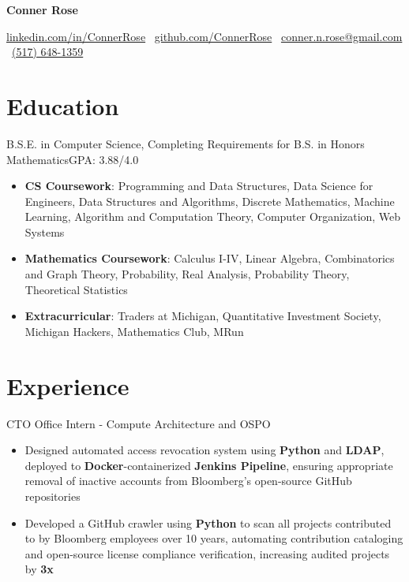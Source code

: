\documentclass[letterpaper,11pt]{article}
\begin{document}

\begin{center}
    \Huge{\textbf{Conner Rose}} \\
    \small
    \begin{center}
        \href{https://linkedin.com/in/ConnerRose}{linkedin.com/in/ConnerRose}
        \ \href{https://github.com/ConnerRose}{github.com/ConnerRose}
        \ \href{mailto:conner.n.rose@gmail.com}{conner.n.rose@gmail.com}
        \ \href{tel:+15176481359}{(517) 648-1359}
    \end{center}
\end{center}

\section{Education}
{B.S.E. in Computer Science, Completing Requirements for B.S. in Honors Mathematics}{GPA: 3.88/4.0}
\begin{itemize}
    \item \textbf{CS Coursework}: Programming and Data Structures, Data Science for
          Engineers, Data Structures and Algorithms, Discrete Mathematics, Machine
          Learning, Algorithm and Computation Theory, Computer Organization, Web Systems
    \item \textbf{Mathematics Coursework}: Calculus I-IV, Linear Algebra, Combinatorics
          and Graph Theory, Probability, Real Analysis, Probability Theory, Theoretical
          Statistics
    \item \textbf{Extracurricular}: Traders at Michigan, Quantitative Investment Society,
          Michigan Hackers, Mathematics Club, MRun
\end{itemize}

\section{Experience}
{CTO Office Intern - Compute Architecture and OSPO}{}
\begin{itemize}
    \item Designed automated access revocation system using \textbf{Python} and
          \textbf{LDAP}, deployed to \textbf{Docker}-containerized \textbf{Jenkins
              Pipeline}, ensuring appropriate removal of inactive accounts from Bloomberg's
          open-source GitHub repositories
    \item Developed a GitHub crawler using \textbf{Python} to scan all projects
          contributed to by Bloomberg employees over 10 years, automating contribution
          cataloging and open-source license compliance verification, increasing audited
          projects by \textbf{3x}
\end{itemize}
\end{document}
